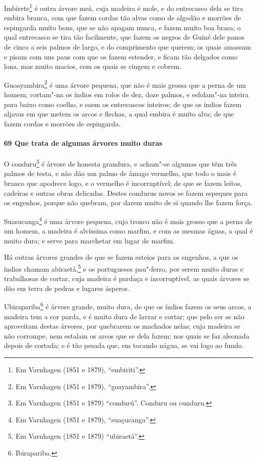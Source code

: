 Imbirete\footnote{ Em Varnhagen (1851 e 1879), ``embiriti''.} é outra árvore meã, cuja
madeira é mole, e do entrecasco dela se tira embira branca, com que fazem cordas tão alvas
como de algodão e morrões de espingarda muito bons, que se não apagam nunca, e fazem muito
boa brasa; o qual entrecasco se tira tão facilmente, que fazem os negros de Guiné dele
panos de cinco a seis palmos de largo, e do comprimento que querem; os quais amassam e
pisam com uns paus com que os fazem estender, e ficam tão delgados como lona, mas muito
macios, com os quais se cingem e cobrem.

Guoayambira\footnote{ Em Varnhagen (1851 e 1879), ``goayambira''.} é uma árvore pequena,
que não é mais grossa que a perna de um homem; cortam"-na os índios em rolos de dez, doze
palmos, e esfolam"-na inteira para baixo como coelho, e saem os entrecascos inteiros; de
que os índios fazem aljavas em que metem os arcos e flechas, a qual embira é muito alva;
de que fazem cordas e morrões de espingarda.

\paragraph{69 Que trata de algumas árvores muito duras}

O conduru\footnote{ Em Varnhagen (1851 e 1879) ``condurú''. Conduru ou cunduru.} é árvore
de honesta grandura, e acham"-se algumas que têm três palmos de testa, e não dão um palmo
de âmago vermelho, que todo o mais é branco que apodrece logo, e o vermelho é
incorruptível; de que se fazem leitos, cadeiras e outras obras delicadas. Destes condurus
novos se fazem espeques para os engenhos, porque não quebram, por darem muito de si quando
lhe fazem força.

Suasucanga\footnote{ Em Varnhagen (1851 e 1879), ``suaçucanga''.} é uma árvore pequena,
cujo tronco não é mais grosso que a perna de um homem, a madeira é alvíssima como marfim,
e com as mesmas águas, a qual é muito dura; e serve para marchetar em lugar de marfim.

Há outras árvores grandes de que se fazem esteios para os engenhos, a que os índios chamam
abiraetá,\footnote{ Em Varnhagen (1851 e 1879) ``ubiraetá''.} e os portugueses pau"-ferro,
por serem muito duras e trabalhosas de cortar, cuja madeira é pardaça e incorruptível, as
quais árvores se dão em terra de pedras e lugares ásperos.

Ubirapariba\footnote{ Ibirapariba.} é árvore grande, muito dura, de que os índios fazem os
seus arcos, a madeira tem a cor parda, e é muito dura de lavrar e cortar; que pelo ser se
não aproveitam destas árvores, por quebrarem os machados nelas; cuja madeira se não
corrompe, nem estalam os arcos que se dela fazem; nos quais se faz aleonada depois de
cortada; e é tão pesada que, em tocando nágua, se vai logo ao fundo.

